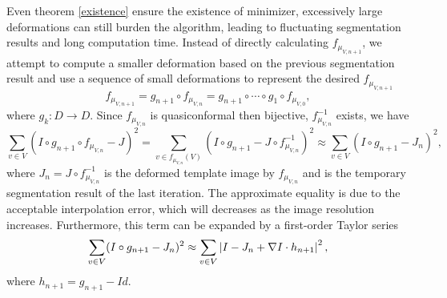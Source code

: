 \documentclass[review,onefignum,onetabnum]{siamonline190516}
\begin{document}
Even theorem \ref{existence} ensure the existence of minimizer, excessively large deformations can still burden the algorithm, leading to fluctuating segmentation results and long computation time. Instead of directly calculating $f_{\mu_{V,n+1}}$, we attempt to compute a smaller deformation based on the previous segmentation result and use a sequence of small deformations to represent the desired $f_{\mu_{V,n+1}}$
\begin{equation}
    f_{\mu_{V,n+1}} = g_{n+1} \circ f_{\mu_{V,n}} = g_{n+1} \circ \cdots \circ g_1 \circ f_{\mu_{V,0}},
\end{equation}
where $g_k: D \rightarrow D$. Since $f_{\mu_{V,n}}$ is quasiconformal then bijective, $f_{\mu_{V,n}}^{-1}$ exists, we  have
\begin{equation}\label{mu 1st term approx v}
    \sum_{v \in V} (I \circ g_{n+1} \circ f_{\mu_{V,n}} - J)^2
    = \sum_{v \in f_{\mu_{V,n}}(V)} (I \circ g_{n+1} - J \circ f_{\mu_{V,n}}^{-1})^2 
    \approx \sum_{v \in V} (I \circ g_{n+1} - J_n)^2,
\end{equation}
where $J_n = J \circ f_{\mu_{V,n}}^{-1}$ is the deformed template image by $f_{\mu_{V,n}}$ and is the temporary segmentation result of the last iteration. The approximate equality is due to the acceptable interpolation error, which will decreases as the image resolution increases. Furthermore, this term can be expanded by a first-order Taylor series
\begin{equation}\label{mu 1st term taylor}
    \sum_{v \in V} (I \circ g_{n+1} - J_n)^2 
    \approx \sum_{v \in V} \abs{I - J_n + \nabla I \cdot h_{n+1}}^2,
\end{equation}
where $h_{n+1} = g_{n+1} - Id$. 
\end{document}
